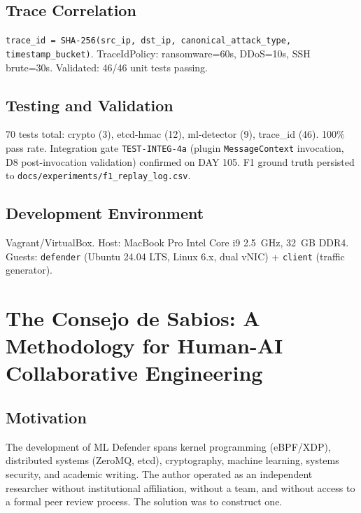\documentclass[11pt,a4paper]{article}
\begin{document}
    \subsection{Trace Correlation}

    \texttt{trace\_id = SHA-256(src\_ip, dst\_ip, canonical\_attack\_type, timestamp\_bucket)}.
    TraceIdPolicy: ransomware=60s, DDoS=10s, SSH brute=30s. Validated: 46/46 unit tests passing.

    \subsection{Testing and Validation}

    70 tests total: crypto (3), etcd-hmac (12), ml-detector (9), trace\_id (46). 100\% pass
    rate. Integration gate \texttt{TEST-INTEG-4a} (plugin \texttt{MessageContext} invocation,
    D8 post-invocation validation) confirmed on DAY 105.
    F1 ground truth persisted to \texttt{docs/experiments/f1\_replay\_log.csv}.

    \subsection{Development Environment}

    Vagrant/VirtualBox. Host: MacBook Pro Intel Core i9 2.5~GHz, 32~GB DDR4. Guests: \texttt{defender} (Ubuntu 24.04
    LTS, Linux 6.x, dual vNIC) + \texttt{client} (traffic generator).

    \section{The Consejo de Sabios: A Methodology for Human-AI Collaborative Engineering}
    \label{sec:consejo}

    \subsection{Motivation}

    The development of ML Defender spans kernel programming (eBPF/XDP), distributed systems
    (ZeroMQ, etcd), cryptography, machine learning, systems security, and academic writing. The
    author operated as an independent researcher without institutional affiliation, without a
    team, and without access to a formal peer review process. The solution was to construct one.
\end{document}
